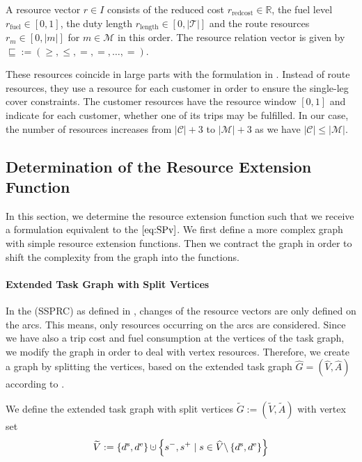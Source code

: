 A resource vector $r\in I$ consists of the reduced cost ${r_{\operatorname{redcost}}\in\mathbb{R}}$, the fuel level ${r_{\operatorname{fuel}}\in[0,1]}$, the duty length ${r_{\operatorname{length}}\in[0,|\mathcal{T}|]}$ and the route resources ${r_m\in[0,|m|]}$ for $m\in\mathcal{M}$ in this order. The resource relation vector is given by ${\sqsubseteq := \left(\geq,\leq,=,=,\dots,=\right)}$.

These resources coincide in large parts with the formulation in \cite{Kaiser}. Instead of route resources, they use a resource for each customer in order to ensure the single-leg cover constraints. The customer resources have the resource window ${[0,1]}$ and indicate for each customer, whether one of its trips may be fulfilled. In our case, the number of resources increases from ${\vert\mathcal{C}\vert+3}$ to ${\vert\mathcal{M}\vert+3}$ as we have ${\vert\mathcal{C}\vert\leq\vert\mathcal{M}\vert}$.


\subsection{Determination of the Resource Extension Function}
\label{sec:ref}

In this section, we determine the resource extension function such that we receive a formulation equivalent to the $\eqref{eq:SPv}$. We first define a more complex graph with simple resource extension functions. Then we contract the graph in order to shift the complexity from the graph into the functions.

\paragraph{Extended Task Graph with Split Vertices} \parfill

In the (SSPRC) as defined in , changes of the resource vectors are only defined on the arcs. This means, only resources occurring on the arcs are considered. Since we have also a trip cost and fuel consumption at the vertices of the task graph, we modify the graph in order to deal with vertex resources. Therefore, we create a graph by splitting the vertices, based on the extended task graph $\widehat{G}=\left(\widehat{V},\widehat{A}\right)$ according to . 

We define the extended task graph with split vertices ${\widetilde{G} := \left(\widetilde{V},\widetilde{A}\right)}$ with vertex set
\begin{align*}
	\widetilde{V} := \left\{\ds,\de\right\}\cupdot\left\{s^-,s^+\mid s\in\widehat{V}\backslash\left\{\ds,\de\right\}\right\}
\end{align*}

